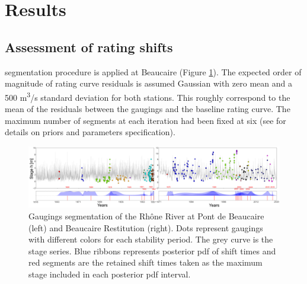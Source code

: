 \documentclass[11pt]{article}
\begin{document}
 \section{Results}
 
    \subsection{Assessment of rating shifts}

    \citet{darienzo_detection_2021} segmentation procedure is applied at Beaucaire (Figure \ref{fig:SegmBoth}). The expected order of magnitude of rating curve residuals is assumed Gaussian with zero mean and a 500 m\textsuperscript{3}/s standard deviation for both stations. This roughly correspond to the mean of the residuals between the gaugings and the baseline rating curve. The maximum number of segments at each iteration had been fixed at six (see \citet{darienzo_detection_2021} for details on priors and parameters specification).

    \begin{figure}[h!]
        \centering
        \includegraphics[width = 1\linewidth]{Figs/6-SegmBoth.png}
        \caption{Gaugings segmentation of the Rhône River at Pont de Beaucaire (left) and Beaucaire Restitution (right). Dots represent gaugings with different colors for each stability period. The grey curve is the stage series. Blue ribbons represents posterior pdf of shift times and red segments are the retained shift times taken as the maximum stage included in each posterior pdf interval.}
        \label{fig:SegmBoth}
    \end{figure}
    
\end{document}

